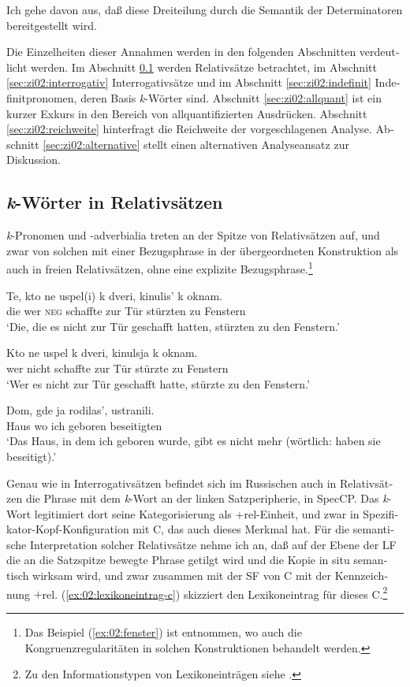 \documentclass[output=paper, colorlinks, citecolor=brown, booklanguage=german]{langscibook}
\begin{document}
\begin{otherlanguage}{german}
\noindent Ich gehe davon aus, daß diese Dreiteilung durch die Semantik der Determinatoren bereitgestellt wird.

Die Einzelheiten dieser Annahmen werden in den folgenden Abschnitten ver\-deut\-licht werden. Im Abschnitt \ref{sec:zi02:relativ} werden Relativsätze betrachtet, im Abschnitt \ref{sec:zi02:interrogativ} Interrogativsätze und im Abschnitt \ref{sec:zi02:indefinit} Indefinitpronomen, deren Basis \textit{k}-Wörter sind. Abschnitt \ref{sec:zi02:allquant} ist ein kurzer Exkurs in den Bereich von allquantifizierten Ausdrücken. Abschnitt \ref{sec:zi02:reichweite} hinterfragt die Reichweite der vorgeschlagenen Analyse. Abschnitt \ref{sec:zi02:alternative} stellt einen alternativen Analyseansatz zur Diskussion. 

\subsection{\textit{k}-Wörter in Relativsätzen}\label{sec:zi02:relativ}

\textit{k}-Pronomen und -adverbialia treten an der Spitze von Relativsätzen auf, und zwar von solchen mit einer Bezugsphrase in der übergeordneten Konstruktion als auch in freien Relativsätzen, ohne eine explizite Bezugsphrase.\footnote{Das Beispiel (\ref{ex:02:fenster}) ist \citet[108]{Mamonov.Rozental1957} entnommen, wo auch die Kongruenz\-re\-gu\-laritäten in solchen Konstruktionen behandelt werden.}

\ea\label{ex:02:fenster}
    \gll Te, kto ne uspel(i) k dveri, kinulis' k oknam.\\
    die wer \textsc{neg} schaffte zur Tür stürzten zu Fenstern\\
    \glt ‘Die, die es nicht zur Tür geschafft hatten, stürzten zu den Fenstern.’
\z 

\ea\label{ex:02:fenster-2}
    \gll Kto ne uspel k dveri, kinulsja k oknam.\\
    wer nicht schaffte zur Tür stürzte zu Fenstern\\
    \glt ‘Wer es nicht zur Tür geschafft hatte, stürzte zu den Fenstern.’
\z 

\ea\label{ex:02:dom}
    \gll Dom, gde ja rodilas', ustranili.\\
    Haus wo ich geboren beseitigten\\
    \glt ‘Das Haus, in dem ich geboren wurde, gibt es nicht mehr (wörtlich: haben sie beseitigt).’
\z 

\noindent Genau wie in Interrogativsätzen befindet sich im Russischen auch in Relativsätzen die Phrase mit dem \textit{k}-Wort an der linken Satzperipherie, in SpecCP. Das \textit{k}-Wort legitimiert dort seine Kategorisierung als $+$rel-Einheit, und zwar in Spe\-zi\-fi\-ka\-tor-Kopf-Konfiguration mit C, das auch dieses Merkmal hat. Für die semantische Interpretation solcher Relativsätze nehme ich an, daß auf der Ebene der LF die an die Satzspitze bewegte Phrase getilgt wird und die Kopie in situ semantisch wirksam wird, und zwar zusammen mit der SF von C mit der Kenn\-zeichnung $+$rel. (\ref{ex:02:lexikoneintrag-c}) skizziert den Lexikoneintrag für dieses C.\footnote{Zu den Informationstypen von Lexikoneinträgen siehe \citet{Jackendoff1975}.}


\end{otherlanguage}
\end{document}
